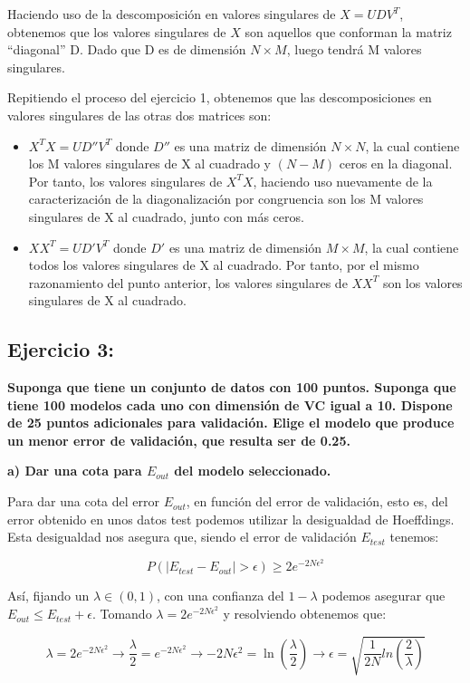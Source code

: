\documentclass{article}
\begin{document}
	Haciendo uso de la descomposición en valores singulares de $X = U D V^T$, obtenemos que los valores singulares de $X$ son aquellos que conforman la matriz ``diagonal'' D. Dado que D es de dimensión $N \times M$, luego tendrá M valores singulares.
	
	Repitiendo el proceso del ejercicio 1, obtenemos que las descomposiciones en valores singulares de las otras dos matrices son:
	
	\begin{itemize}
		\item $X^TX = U D'' V^T$ donde $D''$ es una matriz de dimensión $N \times N$, la cual contiene los M valores singulares de X al cuadrado y $(N-M)$ ceros en la diagonal. Por tanto, los valores singulares de $X^TX$, haciendo uso nuevamente de la caracterización de la diagonalización por congruencia son los M valores singulares de X al cuadrado, junto con más ceros.
		\item $XX^T = U D' V^T$ donde $D'$ es una matriz de dimensión $M \times M$, la cual contiene todos los valores singulares de X al cuadrado. Por tanto, por el mismo razonamiento del punto anterior, los valores singulares de $XX^T$ son los valores singulares de X al cuadrado.
	\end{itemize}

\subsection{Ejercicio 3:} 
\textbf{Suponga que tiene un conjunto de datos con 100 puntos. Suponga que tiene 100 modelos cada uno con dimensión de VC igual a 10. Dispone de 25 puntos adicionales para validación. Elige el modelo que produce un menor error de validación, que resulta ser de 0.25.}

\textbf{a) Dar una cota para $E_{out}$ del modelo seleccionado.}
	
	Para dar una cota del error $E_{out}$, en función del error de validación, esto es, del error obtenido en unos datos test podemos utilizar la desigualdad de Hoeffdings. Esta desigualdad nos asegura que, siendo el error de validación $E_{test}$ tenemos:
	
	\[
		P(|E_{test} - E_{out}| > \epsilon) \geq 2 e ^{-2N\epsilon^2}
	\]
	
	Así, fijando un $\lambda \in (0,1)$, con una confianza del $1-\lambda$ podemos asegurar que $E_{out} \leq E_{test} + \epsilon$. Tomando $\lambda = 2 e ^{-2N\epsilon^2}$ y resolviendo obtenemos que:
	
	\[
		\lambda = 2 e ^{-2N\epsilon^2} \rightarrow \frac{\lambda}{2} = e ^{-2N\epsilon^2} \rightarrow -2N\epsilon^2 = \ln\left(\frac{\lambda}{2}\right) \rightarrow	\epsilon = \sqrt{\frac{1}{2N}ln\left( \frac{2}{\lambda}\right)}
	\]
	
\end{document}
